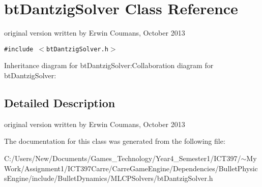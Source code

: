 \hypertarget{classbt_dantzig_solver}{
\section{btDantzigSolver Class Reference}
\label{classbt_dantzig_solver}
}
original version written by Erwin Coumans, October 2013  


{\tt \#include $<$btDantzigSolver.h$>$}

Inheritance diagram for btDantzigSolver:Collaboration diagram for btDantzigSolver:

\subsection{Detailed Description}
original version written by Erwin Coumans, October 2013 

The documentation for this class was generated from the following file:\begin{CompactItemize}
\item 
C:/Users/New/Documents/Games\_\-Technology/Year4\_\-Semester1/ICT397/$\sim$My Work/Assignment1/ICT397Carre/CarreGameEngine/Dependencies/BulletPhysicsEngine/include/BulletDynamics/MLCPSolvers/btDantzigSolver.h\end{CompactItemize}
